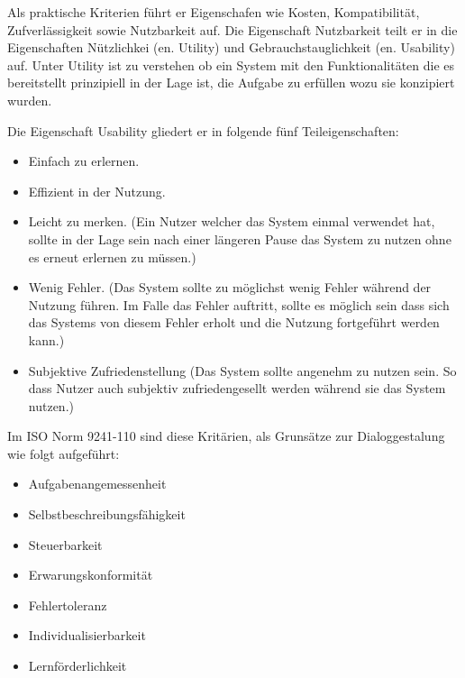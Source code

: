 Als praktische Kriterien führt er Eigenschafen wie Kosten, Kompatibilität, Zufverlässigkeit sowie Nutzbarkeit auf. 
Die Eigenschaft Nutzbarkeit teilt er in die Eigenschaften Nützlichkei (en. Utility) und Gebrauchstauglichkeit (en. Usability) auf. Unter Utility ist zu verstehen ob ein System mit den Funktionalitäten die es bereitstellt prinzipiell 
in der Lage ist, die Aufgabe zu erfüllen wozu sie konzipiert wurden.

Die Eigenschaft Usability gliedert er in folgende fünf Teileigenschaften: 

\begin{itemize}
	\item Einfach zu erlernen.
	\item Effizient in der Nutzung.
	\item Leicht zu merken. (Ein Nutzer welcher das System einmal verwendet hat, sollte in der Lage sein nach einer längeren Pause das System zu nutzen ohne es erneut erlernen zu müssen.)
	\item Wenig Fehler. (Das System sollte zu möglichst wenig Fehler während der Nutzung führen. Im Falle das Fehler auftritt, sollte es möglich sein dass sich das Systems von diesem Fehler erholt und die Nutzung fortgeführt werden kann.)
	\item Subjektive Zufriedenstellung (Das System sollte angenehm zu nutzen sein. So dass Nutzer auch subjektiv zufriedengesellt werden während sie das System nutzen.)
\end{itemize}

Im ISO Norm  9241-110 sind diese Kritärien, als Grunsätze zur Dialoggestalung wie folgt aufgeführt: %

\begin{itemize}
	\item Aufgabenangemessenheit
	\item Selbstbeschreibungsfähigkeit
	\item Steuerbarkeit
	\item Erwarungskonformität
	\item Fehlertoleranz
	\item Individualisierbarkeit
	\item Lernförderlichkeit
\end{itemize}



